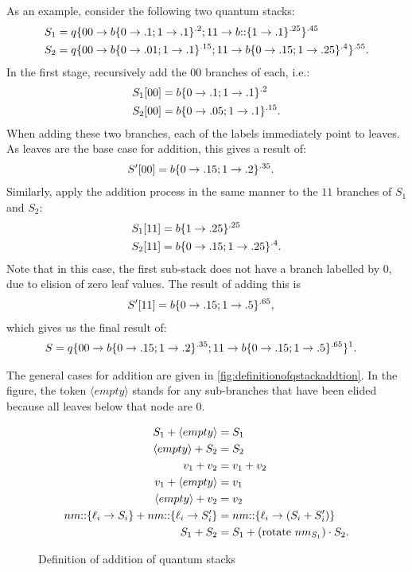 As an
example, consider the following two quantum stacks:
\begin{align*}
S_1 &= q\{00\to b\{0\to {.1};1\to {.1}\}^{.2};11\to b{::}\{1\to.1\}^{.25}\}^{.45}\\
S_2 &= q\{00\to b\{0\to {.01};1\to {.1}\}^{.15};11\to b\{0\to {.15};1\to {.25}\}^{.4}\}^{.55}.
\end{align*}
In the first stage, recursively add the $00$ branches of each, i.e.:
\begin{align*}
S_1[00] &=  b\{0\to {.1};1\to {.1}\}^{.2}\\
S_2[00] &=  b\{0\to {.05};1\to {.1}\}^{.15}.
\end{align*}
When adding these two branches, each of the labels immediately 
point to leaves. As leaves are the base case for addition, this gives
a result of:
\begin{align*}
S'[00] &=  b\{0\to {.15};1\to {.2}\}^{.35}.
\end{align*}
Similarly, apply the addition process in the same manner  to the $11$ branches
of $S_1$ and $S_2$:
\begin{align*}
S_1[11] &=  b\{{1}\to {.25}\}^{.25}\\
S_2[11] &=  b\{0\to {.15};1\to {.25}\}^{.4}.
\end{align*}
Note that in this case, the first sub-stack does not have a branch labelled
by $0$, due to elision of zero leaf values. The result of adding this is
\begin{align*}
S'[11] &= b\{0\to {.15};1\to {.5}\}^{.65},
\end{align*}
which gives us the final result of:
\begin{align*}
S&=q\{00\to b\{0\to {.15};1\to {.2}\}^{.35}; 11\to b\{0\to {.15};1\to {.5}\}^{.65}\}^{1}.
\end{align*}

The general cases for  addition are given in 
\vref{fig:definitionofqstackaddtion}. In the figure, the 
token $ \langle empty \rangle$ stands for any sub-branches that
have been elided because all leaves below that node are $0$.

\begin{figure}[htbp]
\begin{singlespace}
\begin{align*}
S_1  + \langle empty \rangle &= S_1\\
\langle empty \rangle + S_2 &= S_2\\
v_1 + v_2 &= v_1 + v_2 \\
v_1 + \langle empty \rangle  &= v_1 \\
\langle empty \rangle + v_2 &=  v_2 \\
nm{::}\{\ell_{i} \to S_i\} +  nm{::}\{\ell_{i} \to S'_i\}
    &= nm{::}\{\ell_i \to (S_i + S'_i)\}\\
S_1 + S_2 &= S_1 +{(\text{rotate}\ nm_{S_1})}\cdot{S_2}.
\end{align*}
\caption{Definition of addition of quantum stacks}\label{fig:definitionofqstackaddtion}
\end{singlespace}
\end{figure} 



